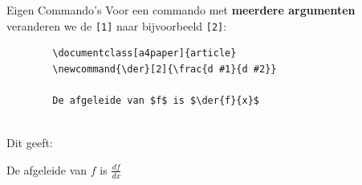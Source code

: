 \begin{frame}[fragile]{Eigen Commando's}
    Voor een commando met \textbf{meerdere argumenten} veranderen we de 
    \texttt{[1]} naar bijvoorbeeld \texttt{[2]}:
    \begin{verbatim}
        \documentclass[a4paper]{article}
        \newcommand{\der}[2]{\frac{d #1}{d #2}}
        
        De afgeleide van $f$ is $\der{f}{x}$
        
    \end{verbatim}
    \pause
    Dit geeft:
    \newcommand{\der}[2]{\frac{d #1}{d #2}}
    \begin{tcolorbox}[boxrule=0.5pt, colback=white]
        De afgeleide van $f$ is $\der{f}{x}$
    \end{tcolorbox}
\end{frame}